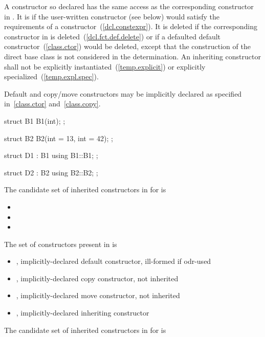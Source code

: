 \pnum
A constructor so declared has the same access as the corresponding constructor
in .
It is  if the user-written constructor (see below)
would satisfy the requirements of a
 constructor~(\ref{dcl.constexpr}).
It is deleted if the corresponding constructor in  is
deleted~(\ref{dcl.fct.def.delete})
or if a defaulted default constructor~(\ref{class.ctor}) would be deleted,
except that the construction of the direct base
class  is not considered in the determination.
An inheriting constructor shall not be explicitly
instantiated~(\ref{temp.explicit}) or explicitly specialized~(\ref{temp.expl.spec}).

\pnum
\enternote Default and copy/move constructors may be implicitly declared as specified in~\ref{class.ctor} and~\ref{class.copy}. \exitnote

\pnum \enterexample

\begin{codeblock}
struct B1 {
  B1(int);
};

struct B2 {
  B2(int = 13, int = 42);
};

struct D1 : B1 {
  using B1::B1;
};

struct D2 : B2 {
  using B2::B2;
};
\end{codeblock}

The candidate set of inherited constructors in  for  is

\begin{itemize}
\item {}
\item {}
\item {}
\end{itemize}

The set of constructors present in  is

\begin{itemize}
\item {}, implicitly-declared default constructor, ill-formed if odr-used
\item {}, implicitly-declared copy constructor, not inherited
\item {}, implicitly-declared move constructor, not inherited
\item {}, implicitly-declared inheriting constructor
\end{itemize}

The candidate set of inherited constructors in  for  is

